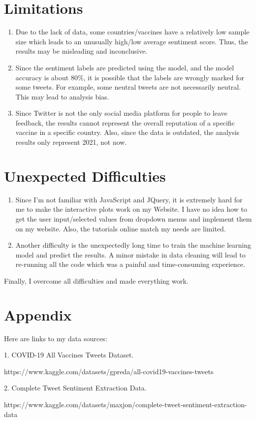 \documentclass{article}
\begin{document}
\section{Limitations}
\begin{enumerate}
\item Due to the lack of data, some countries/vaccines have a relatively low sample size which leads to an unusually high/low average sentiment score.  Thus, the results may be misleading and inconclusive.
\item Since the sentiment labels are predicted using the model, and the model accuracy is about 80\%, it is possible that the labels are wrongly marked for some tweets. For example, some neutral tweets are not necessarily neutral. This may lead to analysis bias.
\item Since Twitter is not the only social media platform for people to leave feedback, the results cannot represent the overall reputation of a specific vaccine in a specific country. Also, since the data is outdated, the analysis results only represent 2021, not now.
\end{enumerate}

\section{Unexpected Difficulties}
\begin{enumerate}
\item Since I'm not familiar with JavaScript and JQuery, it is extremely hard for me to make the interactive plots work on my Website. I have no idea how to get the user input/selected values from dropdown menus and implement them on my website. Also, the tutorials online match my needs are limited. 
\item Another difficulty is the unexpectedly long time to train the machine learning model and predict the results. A minor mistake in data cleaning will lead to re-running all the code which was a painful and time-consuming experience. 
\end{enumerate}
Finally, I overcome all difficulties and made everything work.

\section{Appendix}

Here are links to my data sources:

1. COVID-19 All Vaccines Tweets Dataset. 

https://www.kaggle.com/datasets/gpreda/all-covid19-vaccines-tweets

2. Complete Tweet Sentiment Extraction Data.

https://www.kaggle.com/datasets/maxjon/complete-tweet-sentiment-extraction-data
\end{document}
